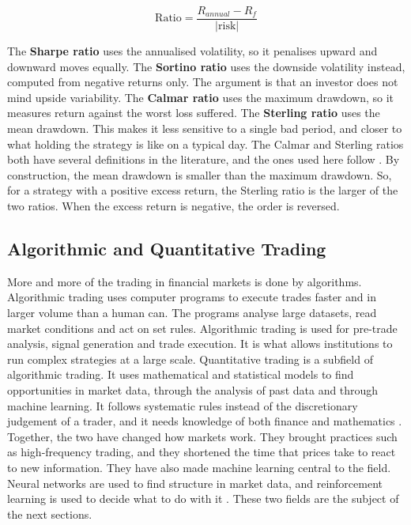 \begin{equation}
\text{Ratio} = \frac{R_{annual} - R_f}{\left| \text{risk} \right|}
\label{Equation:RiskRatio}
\end{equation}

The \textbf{Sharpe ratio} \cite{sharpe_sharpe_1994} uses the annualised volatility, so it penalises upward and downward moves equally. The \textbf{Sortino ratio} \cite{sortino_performance_1994} uses the downside volatility instead, computed from negative returns only. The argument is that an investor does not mind upside variability. The \textbf{Calmar ratio} uses the maximum drawdown, so it measures return against the worst loss suffered. The \textbf{Sterling ratio} uses the mean drawdown. This makes it less sensitive to a single bad period, and closer to what holding the strategy is like on a typical day. The Calmar and Sterling ratios both have several definitions in the literature, and the ones used here follow \cite{bacon_practical_2023}. By construction, the mean drawdown is smaller than the maximum drawdown. So, for a strategy with a positive excess return, the Sterling ratio is the larger of the two ratios. When the excess return is negative, the order is reversed.

\subsection{Algorithmic and Quantitative Trading}

More and more of the trading in financial markets is done by algorithms. Algorithmic trading uses computer programs to execute trades faster and in larger volume than a human can. The programs analyse large datasets, read market conditions and act on set rules. Algorithmic trading is used for pre-trade analysis, signal generation and trade execution. It is what allows institutions to run complex strategies at a large scale. Quantitative trading is a subfield of algorithmic trading. It uses mathematical and statistical models to find opportunities in market data, through the analysis of past data and through machine learning. It follows systematic rules instead of the discretionary judgement of a trader, and it needs knowledge of both finance and mathematics \cite{chan_quantitative_2021}. Together, the two have changed how markets work. They brought practices such as high-frequency trading, and they shortened the time that prices take to react to new information. They have also made machine learning central to the field. Neural networks are used to find structure in market data, and reinforcement learning is used to decide what to do with it \cite{jansen_machine_2020}. These two fields are the subject of the next sections.